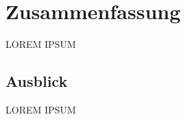 
\section{Zusammenfassung}
\label{sec:Zusammenfassung}
LOREM IPSUM
\subsection{Ausblick}
\label{sec:Zusammenfassung:ssec:Ausblick}
LOREM IPSUM
